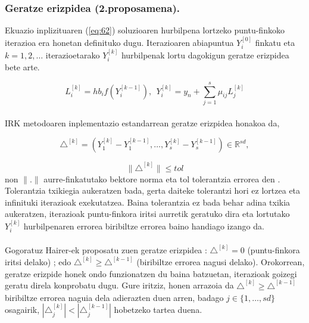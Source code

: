 \subsubsection{Geratze erizpidea (2.proposamena).}

Ekuazio inplizituaren (\ref{eq:62}) soluzioaren hurbilpena lortzeko puntu-finkoko iterazioa era honetan definituko dugu. Iterazioaren abiapuntua $Y_i^{[0]}$  finkatu eta $k=1,2,\dots$ iterazioetarako $Y_i^{[k]}$ hurbilpenak lortu dagokigun geratze erizpidea bete arte.

\begin{equation}
L_i^{[k]}=hb_if(Y_i^{[k-1]}), \ \ Y_i^{[k]}=y_n+\sum\limits_{j=1}^{s} \mu_{ij} L_j^{[k]}
\end{equation}
 
\paragraph*{}IRK metodoaren inplementazio estandarrean geratze erizpidea honakoa da,

\begin{equation*}
\triangle^{[k]}=(Y_1^{[k]}-Y_1^{[k-1]},\dots,Y_s^{[k]}-Y_s^{[k-1]}) \in \mathbb{R}^{sd},
\end{equation*}
 
\begin{equation}
\|\triangle^{[k]}\| \le tol
\end{equation}
non $\|.\|$ aurre-finkatutako bektore norma eta tol tolerantzia errorea den . Tolerantzia txikiegia aukeratzen bada, gerta daiteke tolerantzi hori ez lortzea eta infinituki iterazioak exekutatzea. Baina tolerantzia ez bada behar adina txikia  aukeratzen, iterazioak puntu-finkora iritsi aurretik geratuko dira eta lortutako $Y_i^{[k]}$ hurbilpenaren errorea biribiltze errorea baino handiago izango da.

\paragraph*{} Gogoratuz Hairer-ek proposatu zuen geratze erizpidea :  $\triangle^{[k]} = 0$ (puntu-finkora iritsi delako) ;  edo   $\triangle^{[k]} \geqslant \triangle^{[k-1]}$ (biribiltze errorea nagusi delako). Orokorrean, geratze erizpide honek ondo funzionatzen du baina batzuetan, iterazioak goizegi geratu direla konprobatu dugu. Gure iritziz, honen arrazoia da $\triangle^{[k]} \geqslant \triangle^{[k-1]}$ biribiltze errorea naguia dela adierazten duen arren, badago $j \in \{1,\dots,sd\}$ osagairik,   $|\triangle_j^{[k]}| < |\triangle_j^{[k-1]}|$ hobetzeko tartea duena. 

